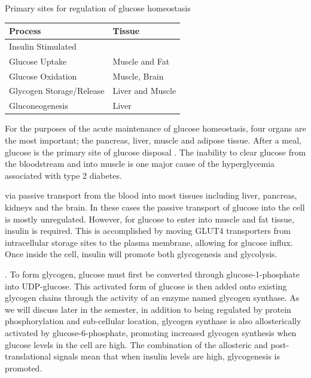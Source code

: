 \documentclass{tufte-handout}
\begin{document}
\begin{margintable}
\caption{Primary sites for regulation of glucose homeostasis}
\label{glucose-sites}
\begin{tabular}{@{}ll@{}}
\textbf{Process }                          & \textbf{Tissue}           \\ \midrule
Insulin Stimulated \\Glucose Uptake & Muscle and Fat   \\ \midrule
Glucose Oxidation & Muscle, Brain \\ \midrule
Glycogen Storage/Release                      & Liver and Muscle \\ \midrule
Gluconeogenesis & Liver \\ \bottomrule
\end{tabular}
\end{margintable}

For the purposes of the acute maintenance of glucose homeostasis, four organs are the most important; the pancreas, liver, muscle and adipose tissue.  After a meal, glucose is the primary site of glucose disposal \citep{DeFronzo1981}.  The inability to clear glucose from the bloodstream and into muscle is one major cause of the hyperglycemia associated with type 2 diabetes.

 via passive transport from the blood into most tissues including liver, pancreas, kidneys and the brain.  In these cases the passive transport of glucose into the cell is mostly unregulated.  However, for glucose to enter into muscle and fat tissue, insulin is required.  This is accomplished by moving GLUT4 transporters from intracellular storage sites to the plasma membrane, allowing for glucose influx.  Once inside the cell, insulin will promote both glycogenesis and glycolysis.  

.  To form glycogen, glucose must first be converted through glucose-1-phosphate into UDP-glucose.  This activated form of glucose is then added onto existing glycogen chains through the activity of an enzyme named glycogen synthase.  As we will discuss later in the semester, in addition to being regulated by protein phosphorylation and sub-cellular location, glycogen synthase is also allosterically activated by glucose-6-phosphate, promoting increased glycogen synthesis when glucose levels in the cell are high.  The combination of the allosteric and post-translational signals mean that when insulin levels are high, glycogenesis is promoted.
\end{document}
